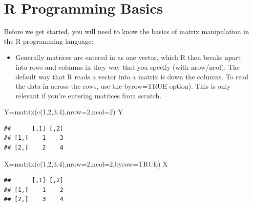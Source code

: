 \documentclass[
]{article}
\newenvironment{Shaded}{\begin{snugshade}}{\end{snugshade}}
\newcommand{\AttributeTok}[1]{\textcolor[rgb]{0.77,0.63,0.00}{#1}}
\newcommand{\ConstantTok}[1]{\textcolor[rgb]{0.00,0.00,0.00}{#1}}
\newcommand{\DecValTok}[1]{\textcolor[rgb]{0.00,0.00,0.81}{#1}}
\newcommand{\FunctionTok}[1]{\textcolor[rgb]{0.00,0.00,0.00}{#1}}
\newcommand{\NormalTok}[1]{#1}
\newcommand{\OtherTok}[1]{\textcolor[rgb]{0.56,0.35,0.01}{#1}}
\providecommand{\tightlist}{%
  \setlength{\itemsep}{0pt}\setlength{\parskip}{0pt}}
\theoremstyle{definition}
\theoremstyle{definition}
\theoremstyle{definition}
\theoremstyle{definition}
\theoremstyle{remark}
\begin{document}
\hypertarget{r-programming-basics}{%
\section{R Programming Basics}\label{r-programming-basics}}

Before we get started, you will need to know the basics of matrix manipulation in the R programming language:

\begin{itemize}
\tightlist
\item
  Generally matrices are entered in as one vector, which R then breaks apart into rows and columns in they way that you specify (with nrow/ncol). The default way that R reads a vector into a matrix is down the columns. To read the data in across the rows, use the byrow=TRUE option). This is only relevant if you're entering matrices from scratch.
\end{itemize}

\begin{Shaded}
\begin{Highlighting}[]
\NormalTok{Y}\OtherTok{=}\FunctionTok{matrix}\NormalTok{(}\FunctionTok{c}\NormalTok{(}\DecValTok{1}\NormalTok{,}\DecValTok{2}\NormalTok{,}\DecValTok{3}\NormalTok{,}\DecValTok{4}\NormalTok{),}\AttributeTok{nrow=}\DecValTok{2}\NormalTok{,}\AttributeTok{ncol=}\DecValTok{2}\NormalTok{)}
\NormalTok{Y}
\end{Highlighting}
\end{Shaded}

\begin{verbatim}
##      [,1] [,2]
## [1,]    1    3
## [2,]    2    4
\end{verbatim}

\begin{Shaded}
\begin{Highlighting}[]
\NormalTok{X}\OtherTok{=}\FunctionTok{matrix}\NormalTok{(}\FunctionTok{c}\NormalTok{(}\DecValTok{1}\NormalTok{,}\DecValTok{2}\NormalTok{,}\DecValTok{3}\NormalTok{,}\DecValTok{4}\NormalTok{),}\AttributeTok{nrow=}\DecValTok{2}\NormalTok{,}\AttributeTok{ncol=}\DecValTok{2}\NormalTok{,}\AttributeTok{byrow=}\ConstantTok{TRUE}\NormalTok{)}
\NormalTok{X}
\end{Highlighting}
\end{Shaded}

\begin{verbatim}
##      [,1] [,2]
## [1,]    1    2
## [2,]    3    4
\end{verbatim}
\end{document}

